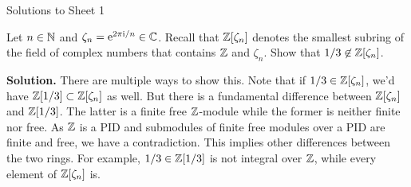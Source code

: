 \documentclass[a4paper,11pt]{article}
\begin{document}
\begin{center}
    \huge{Solutions to Sheet 1}
\end{center}

Let $n \in \mathbb{N}$ and $\zeta_n = \mathrm e^{2 \pi \mathrm i/n} \in \mathbb{C}$. Recall that 
$\mathbb{Z}[\zeta_n]$ denotes the smallest subring of the field of complex numbers
that contains $\mathbb{Z}$ and $\zeta_n$. Show that $1/3 \not \in \mathbb{Z}[\zeta_n]$. 

\textbf{Solution.} There are multiple ways to show this.
 Note that if $1/3 \in \mathbb{Z}[\zeta_n]$, we'd have 
$\mathbb{Z}[1/3] \subset \mathbb{Z}[\zeta_n]$ as well. But there is a fundamental difference between
$\mathbb{Z}[\zeta_n]$ and $\mathbb{Z}[1/3]$. The latter is a finite free $\mathbb{Z}$-module while the 
former is neither finite nor free. As $\mathbb{Z}$ is a PID and submodules of
finite free modules over a PID are finite and free, we have a contradiction.
This implies other differences between the two rings. For example,
$1/3 \in \mathbb{Z}[1/3]$ is not integral over $\mathbb{Z}$, while every element of 
$\mathbb{Z}[\zeta_n]$ is.
\end{document}
